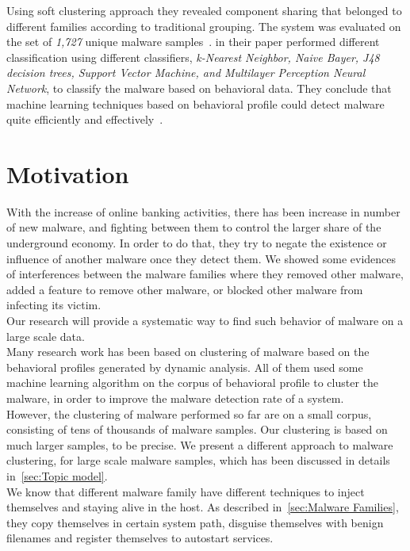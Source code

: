 Using soft clustering approach they revealed component sharing that belonged to different families according to traditional grouping.
The system was evaluated on the set of \emph{1,727} unique malware samples~\cite[]{yavvari}.
\textbf{\citeauthor{firdausi}} in their paper performed different classification using different classifiers, \emph{k-Nearest Neighbor, Naive Bayer, J48 decision trees, Support Vector Machine, and Multilayer Perception Neural Network}, to classify the malware based on behavioral data.
They conclude that machine learning techniques based on behavioral profile could detect malware quite efficiently and effectively~\cite[]{firdausi}.\\
\section{Motivation}
\label{sec:Motivation}
With the increase of online banking activities, there has been increase in number of new malware, and fighting between them to control the larger share of the underground economy.
In order to do that, they try to negate the existence or influence of another malware once they detect them.
We showed some evidences of interferences between the malware families where they removed other malware, added a feature to remove other malware, or blocked other malware from infecting its victim.\\
Our research will provide a systematic way to find such behavior of malware on a large scale data.
\\
Many research work has been based on clustering of malware based on the behavioral profiles generated by dynamic analysis.
All of them used some machine learning algorithm on the corpus of behavioral profile to cluster the malware, in order to improve the malware detection rate of a system.\\
However, the clustering of malware performed so far are on a small corpus, consisting of tens of thousands of malware samples.
Our clustering is based on much larger samples, {\gettotalmalwarei{}} to be precise.
We present a different approach to malware clustering, for large scale malware samples, which has been discussed in details in~\autoref{sec:Topic model}.\\
We know that different malware family have different techniques to inject themselves and staying alive in the host.
As described in~\autoref{sec:Malware Families}, they copy themselves in certain system path, disguise themselves with benign filenames and register themselves to autostart services.
